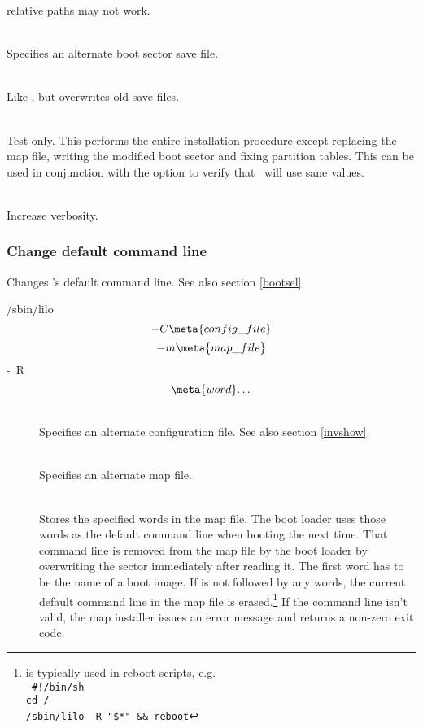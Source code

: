 \begin{description}
    relative paths may not work.
  \item[\raw{-s \meta{save\_file}}]~\\
    Specifies an alternate boot sector save file. \seealso
  \item[\raw{-S \meta{save\_file}}]~\\
    Like , but overwrites old save files.
  \item[\raw{-t}]~ \\
    Test only. This performs the entire installation procedure except
    replacing the map file, writing the modified boot sector and fixing
    partition tables. This
    can be used in conjunction with the  option to verify that
    \LILO\ will use sane values.
  \item[\raw{-v $\ldots$}]~\\
    Increase verbosity. \seealso
\end{description}


\subsubsection{Change default command line}
\label{invcmd}

Changes \LILO's default command line. See also section \ref{bootsel}.

\begin{command}
  /sbin/lilo
    \unit{\[ -C \meta{config\_file} \]}
    \unit{\[ -m \meta{map\_file} \]}
    \unit{-R \[ \meta{word} $\ldots$ \]}
\end{command}

\begin{description}
  \item[]~\\
    Specifies an alternate configuration file. See also section \ref{invshow}.
  \item[]~\\
    Specifies an alternate map file. \seealso
  \item[]~ \\
    Stores the specified words in the map file. The boot loader uses those
    words as the default command line when booting the next time. That command
    line is removed from the map file by the boot loader by overwriting the
    sector immediately after reading it. The first word has
    to be the name of a boot image. If  is not followed by any words,
    the current default command line in the map file is erased.\footnote{%
       is typically used in reboot scripts, e.g. \\
\tt
\#!/bin/sh \\
cd / \\
/sbin/lilo -R "\$*" \&\& reboot}
    If the command line isn't valid, the map installer issues an error
    message and returns a non-zero exit code.
\end{description}


